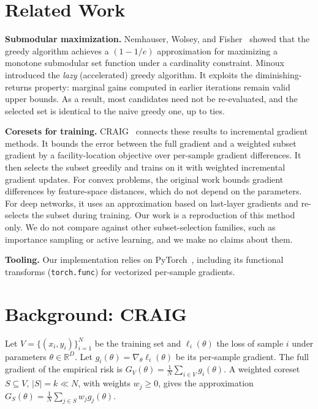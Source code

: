 \documentclass[conference]{IEEEtran}
\begin{document}
\section{Related Work}
\textbf{Submodular maximization.} Nemhauser, Wolsey, and Fisher~\cite{nemhauser1978analysis} showed that the greedy algorithm achieves a $(1-1/e)$ approximation for maximizing a monotone submodular set function under a cardinality constraint. Minoux~\cite{minoux1978accelerated} introduced the \emph{lazy} (accelerated) greedy algorithm. It exploits the diminishing-returns property: marginal gains computed in earlier iterations remain valid upper bounds. As a result, most candidates need not be re-evaluated, and the selected set is identical to the naive greedy one, up to ties.

\textbf{Coresets for training.} CRAIG~\cite{mirzasoleiman2020craig} connects these results to incremental gradient methods. It bounds the error between the full gradient and a weighted subset gradient by a facility-location objective over per-sample gradient differences. It then selects the subset greedily and trains on it with weighted incremental gradient updates. For convex problems, the original work bounds gradient differences by feature-space distances, which do not depend on the parameters. For deep networks, it uses an approximation based on last-layer gradients and re-selects the subset during training. Our work is a reproduction of this method only. We do not compare against other subset-selection families, such as importance sampling or active learning, and we make no claims about them.

\textbf{Tooling.} Our implementation relies on PyTorch~\cite{paszke2019pytorch}, including its functional transforms (\texttt{torch.func}) for vectorized per-sample gradients.

\section{Background: CRAIG}
\label{sec:background}
Let $V=\{(x_i,y_i)\}_{i=1}^N$ be the training set and $\ell_i(\theta)$ the loss of sample $i$ under parameters $\theta\in\mathbb{R}^D$. Let $g_i(\theta)=\nabla_\theta\ell_i(\theta)$ be its per-sample gradient. The full gradient of the empirical risk is $G_V(\theta)=\frac{1}{N}\sum_{i\in V}g_i(\theta)$. A weighted coreset $S\subseteq V$, $|S|=k\ll N$, with weights $w_j\ge 0$, gives the approximation $G_S(\theta)=\frac{1}{N}\sum_{j\in S}w_j g_j(\theta)$.
\end{document}
